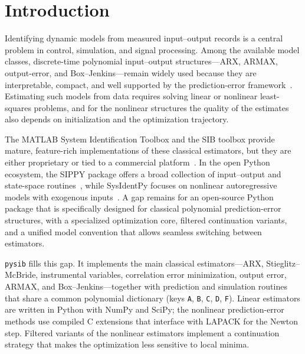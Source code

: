 \documentclass{ifacconf}
\begin{document}
\section{Introduction}
\label{sec:introduction}

Identifying dynamic models from measured input--output records is a
central problem in control, simulation, and signal processing.
Among the available model classes, discrete-time polynomial
input--output structures---ARX, ARMAX, output-error, and
Box--Jenkins---remain widely used because they are interpretable,
compact, and well supported by the prediction-error
framework~\cite{ljung1999,soderstrom1989}.
Estimating such models from data requires solving linear or nonlinear
least-squares problems, and for the nonlinear structures the quality
of the estimates also depends on initialization and the
optimization trajectory.

The MATLAB System Identification Toolbox and the SIB toolbox provide
mature, feature-rich implementations of these classical estimators,
but they are either proprietary or tied to a commercial
platform~\cite{mathworks_sysid,sib_matlab}.
In the open Python ecosystem, the SIPPY package offers a broad
collection of input--output and state-space routines~\cite{sippy},
while SysIdentPy focuses on nonlinear autoregressive models with
exogenous inputs~\cite{sysidentpy}.
A gap remains for an open-source Python package that is specifically
designed for classical polynomial prediction-error structures, with a
specialized optimization core, filtered continuation variants, and a unified
model convention that allows seamless switching between estimators.

\texttt{pysib} fills this gap.
It implements the main classical estimators---ARX, Stieglitz--McBride,
instrumental variables, correlation error minimization, output error,
ARMAX, and Box--Jenkins---together with prediction and simulation
routines that share a common polynomial dictionary (keys
\texttt{A}, \texttt{B}, \texttt{C}, \texttt{D}, \texttt{F}).
Linear estimators are written in Python with NumPy and SciPy; the
nonlinear prediction-error methods use compiled C extensions that
interface with LAPACK for the Newton step.
Filtered variants of the nonlinear estimators implement a continuation
strategy that makes the optimization less sensitive to local minima.
\end{document}
